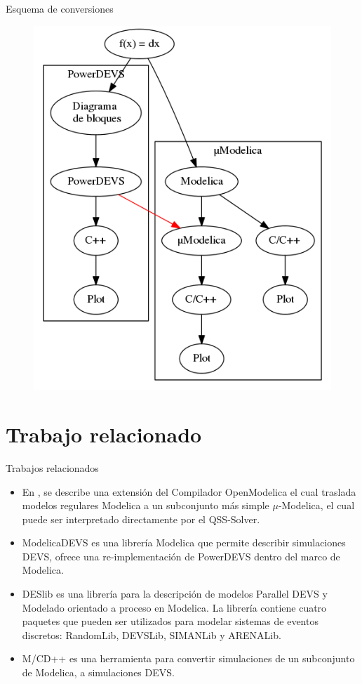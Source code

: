 \documentclass{beamer}
\newcommand{\customcite}[1]{\citetitle{#1}, \citeyear{#1}}
\begin{document}
\begin{frame}{Esquema de conversiones}
\begin{figure}[H]
\centering
 \includegraphics[width=0.55\linewidth]{esquema}
\end{figure}
\end{frame}

\section{Trabajo relacionado}
\begin{frame}{Trabajos relacionados}
\begin{itemize}
	\item<1-> En \customcite{Ber12} se describe una extensión del Compilador OpenModelica el cual traslada modelos regulares Modelica a un subconjunto más simple $\mu$-Modelica, el cual puede ser interpretado directamente por el QSS-Solver.

	\item<2-> ModelicaDEVS es una librería Modelica que permite describir simulaciones DEVS, ofrece una re-implementación de PowerDEVS dentro del marco de Modelica.

	\item<3-> DESlib es una librería para la descripción de modelos Parallel DEVS y Modelado orientado a proceso en Modelica.
La librería contiene cuatro paquetes que pueden ser utilizados para modelar sistemas de eventos discretos: RandomLib, DEVSLib, SIMANLib y ARENALib.

	\item<4-> M/CD++ es una herramienta para convertir simulaciones de un subconjunto de Modelica, a simulaciones DEVS.
\end{itemize}
\end{frame}
\end{document}
